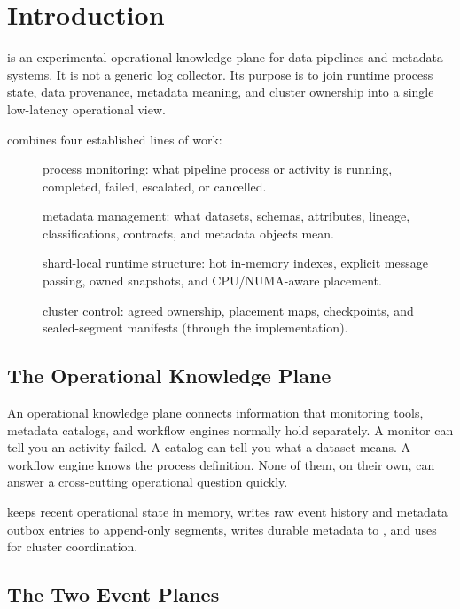 \section{Introduction}
\label{sec:introduction}

\vannak{} is an experimental operational knowledge plane for data pipelines and
metadata systems. It is not a generic log collector. Its purpose is to join
runtime process state, data provenance, metadata meaning, and cluster ownership
into a single low-latency operational view.

\vannak{} combines four established lines of work:

\begin{description}
\item[\durga{}] process monitoring: what pipeline process or activity is
  running, completed, failed, escalated, or cancelled.
\item[\ipto{}] metadata management: what datasets, schemas, attributes, lineage,
  classifications, contracts, and metadata objects mean.
\item[\sitas{}] shard-local runtime structure: hot in-memory indexes, explicit
  message passing, owned snapshots, and CPU/NUMA-aware placement.
\item[\raft{}] cluster control: agreed ownership, placement maps, checkpoints,
  and sealed-segment manifests (through the \graft{} implementation).
\end{description}

\subsection{The Operational Knowledge Plane}

An operational knowledge plane connects information that monitoring tools,
metadata catalogs, and workflow engines normally hold separately. A monitor can
tell you an activity failed. A catalog can tell you what a dataset means. A
workflow engine knows the process definition. None of them, on their own, can
answer a cross-cutting operational question quickly.

\vannak{} keeps recent operational state in memory, writes raw event history
and metadata outbox entries to append-only segments, writes durable metadata to
\ipto{}, and uses \raft{} for cluster coordination.

\subsection{The Two Event Planes}
\label{sec:intro-two-planes}

